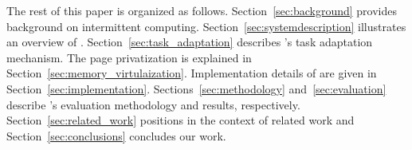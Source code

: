 The rest of this paper is organized as follows. Section~\ref{sec:background} provides background on intermittent computing.
Section~\ref{sec:systemdescription} illustrates an overview of \sys. Section~\ref{sec:task_adaptation} describes \sys's task adaptation mechanism. The page privatization is explained in Section~\ref{sec:memory_virtulaization}. Implementation details of \sys are given in Section~\ref{sec:implementation}. Sections~\ref{sec:methodology} and~\ref{sec:evaluation} describe \sys's evaluation methodology and results, respectively. Section~\ref{sec:related_work} positions \sys in the context of related work and Section~\ref{sec:conclusions} concludes our work.
